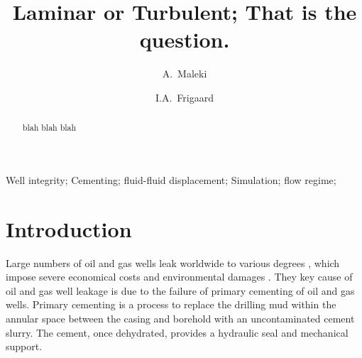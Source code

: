 \documentclass[review]{elsarticle}
\begin{document}

\begin{frontmatter}
\title{Laminar or Turbulent; That is the question.}

\author{A.~Maleki}
\address{Department of Mechanical Engineering, University of British Columbia, 2054-6250 Applied Science Lane, Vancouver, BC, Canada V6T 1Z4.}

\author{I.A.~Frigaard}
\address{Departments of Mathematics and Mechanical Engineering, University of British Columbia, 1984 Mathematics Road, Vancouver, BC, Canada, V6T 1Z2. Tel: 1-604-822-3043; e-mail: frigaard@math.ubc.ca}

\begin{abstract}
blah blah blah
\end{abstract}

\medskip
\begin{keyword}
Well integrity; Cementing; fluid-fluid displacement; Simulation; flow regime;
\end{keyword}
\end{frontmatter}


\section{Introduction}
\label{sec:intro}

Large numbers of oil and gas wells leak worldwide to various degrees \citep{Dusseault2014,davies2014}, which impose severe economical costs \citep{smith1984,Watson2004} and environmental damages \citep{chafin1994,Armstrong2002,Karion2013}.  They key cause of oil and gas well leakage is due to the failure of primary cementing of oil and gas wells. Primary cementing is a process to replace the drilling mud within the annular space between the casing and borehold with an uncontaminated cement slurry. The cement, once dehydrated, provides a hydraulic seal and mechanical support.
\end{document}
